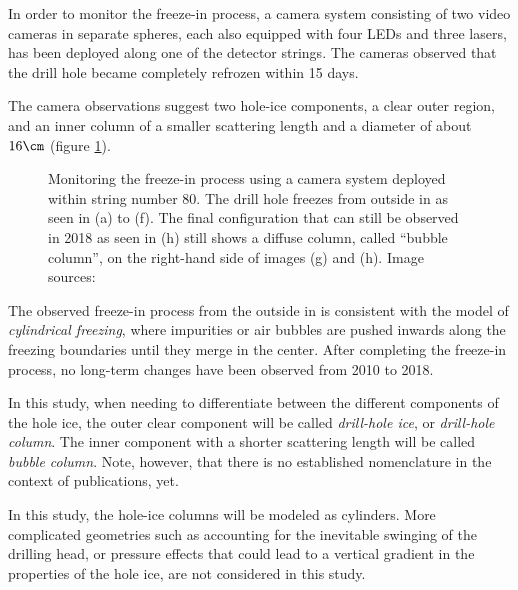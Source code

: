 In order to monitor the freeze-in process, a camera system consisting of two video cameras in separate spheres, each also equipped with four LEDs and three lasers, has been deployed along one of the detector strings. The cameras observed that the drill hole became completely refrozen within 15 days. \cite{instrumentation}

The camera observations suggest two hole-ice components, a clear outer region, and an inner column of a smaller scattering length and a diameter of about $16\cm$ (figure \ref{fig:daeM6yot}). \cite{rongenswedishcamera,instrumentation}

\begin{figure}[htbp]
  \centering
  \hfill
  \hfill
  \hfill
  \hfill
  \hfill
  \hfill
  \hfill
  \hfill
  \caption{Monitoring the freeze-in process using a camera system deployed within string number 80. The drill hole freezes from outside in as seen in (a) to (f). The final configuration that can still be observed in 2018 as seen in (h) still shows a diffuse column, called \enquote{bubble column}, on the right-hand side of images (g) and (h). Image sources: \cite{icrc17pocam, camera2010, camera2018}}
  \label{fig:daeM6yot}
\end{figure}

The observed freeze-in process from the outside in is consistent with the model of \textit{cylindrical freezing}, where impurities or air bubbles are pushed inwards along the freezing boundaries until they merge in the center. \cite{rongenswedishcamera} After completing the freeze-in process, no long-term changes have been observed from 2010 to 2018. \cite{instrumentation, camera2010, camera2018}

In this study, when needing to differentiate between the different components of the hole ice, the outer clear component will be called \textit{drill-hole ice}, or \textit{drill-hole column}. The inner component with a shorter scattering length will be called \textit{bubble column}. Note, however, that there is no established nomenclature in the context of \icecube publications, yet.

In this study, the hole-ice columns will be modeled as cylinders. More complicated geometries such as accounting for the inevitable swinging of the drilling head, or pressure effects that could lead to a vertical gradient in the properties of the hole ice, are not considered in this study.\followup


